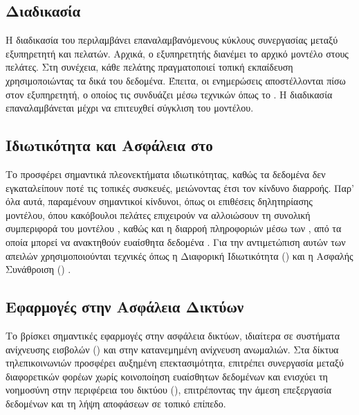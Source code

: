 \subsection{Διαδικασία }

Η διαδικασία του  περιλαμβάνει επαναλαμβανόμενους κύκλους συνεργασίας μεταξύ εξυπηρετητή και πελατών. Αρχικά, ο εξυπηρετητής διανέμει το αρχικό μοντέλο στους πελάτες. Στη συνέχεια, κάθε πελάτης πραγματοποιεί τοπική εκπαίδευση χρησιμοποιώντας τα δικά του δεδομένα. Έπειτα, οι ενημερώσεις αποστέλλονται πίσω στον εξυπηρετητή, ο οποίος τις συνδυάζει μέσω τεχνικών όπως το  \cite{mcmahan2017communication}. Η διαδικασία επαναλαμβάνεται μέχρι να επιτευχθεί σύγκλιση του μοντέλου.

\subsection{Ιδιωτικότητα και Ασφάλεια στο }

Το  προσφέρει σημαντικά πλεονεκτήματα ιδιωτικότητας, καθώς τα δεδομένα δεν εγκαταλείπουν ποτέ τις τοπικές συσκευές, μειώνοντας έτσι τον κίνδυνο διαρροής. Παρ’ όλα αυτά, παραμένουν σημαντικοί κίνδυνοι, όπως οι επιθέσεις δηλητηρίασης μοντέλου, όπου κακόβουλοι πελάτες επιχειρούν να αλλοιώσουν τη συνολική συμπεριφορά του μοντέλου \cite{bhagoji2019analyzing}, καθώς και η διαρροή πληροφοριών μέσω των , από τα οποία μπορεί να ανακτηθούν ευαίσθητα δεδομένα \cite{zhu2019deep}. Για την αντιμετώπιση αυτών των απειλών χρησιμοποιούνται τεχνικές όπως η Διαφορική Ιδιωτικότητα () \cite{dwork2014algorithmic} και η Ασφαλής Συνάθροιση () \cite{bonawitz2017practical}.

\subsection{Εφαρμογές στην Ασφάλεια Δικτύων}

Το  βρίσκει σημαντικές εφαρμογές στην ασφάλεια δικτύων, ιδιαίτερα σε συστήματα ανίχνευσης εισβολών () και στην κατανεμημένη ανίχνευση ανωμαλιών. Στα δίκτυα τηλεπικοινωνιών προσφέρει αυξημένη επεκτασιμότητα, επιτρέπει συνεργασία μεταξύ διαφορετικών φορέων χωρίς κοινοποίηση ευαίσθητων δεδομένων και ενισχύει τη νοημοσύνη στην περιφέρεια του δικτύου (), επιτρέποντας την άμεση επεξεργασία δεδομένων και τη λήψη αποφάσεων σε τοπικό επίπεδο.

